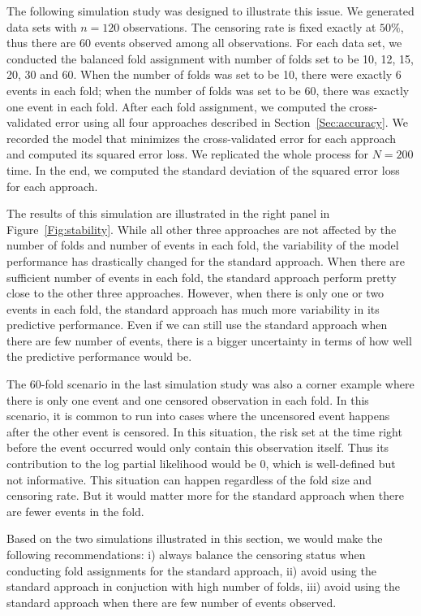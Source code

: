 The following simulation study was designed to illustrate this issue. We generated data sets with $n = 120$ observations. The censoring rate is fixed exactly at $50\%$, thus there are 60 events observed among all observations. For each data set, we conducted the balanced fold assignment with number of folds set to be 10, 12, 15, 20, 30 and 60. When the number of folds was set to be 10, there were exactly 6 events in each fold; when the number of folds was set to be 60, there was exactly one event in each fold. After each fold assignment, we computed the cross-validated error using all four approaches described in Section~\ref{Sec:accuracy}. We recorded the model that minimizes the cross-validated error for each approach and computed its squared error loss. We replicated the whole process for $N = 200$ time. In the end, we computed the standard deviation of the squared error loss for each approach. 

The results of this simulation are illustrated in the right panel in Figure~\ref{Fig:stability}. While all other three approaches are not affected by the number of folds and number of events in each fold, the variability of the model performance has drastically changed for the standard approach. When there are sufficient number of events in each fold, the standard approach perform pretty close to the other three approaches. However, when there is only one or two events in each fold, the standard approach has much more variability in its predictive performance. Even if we can still use the standard approach when there are few number of events, there is a bigger uncertainty in terms of how well the predictive performance would be. 

The 60-fold scenario in the last simulation study was also a corner example where there is only one event and one censored observation in each fold. In this scenario, it is common to run into cases where the uncensored event happens after the other event is censored. In this situation, the risk set at the time right before the event occurred would only contain this observation itself. Thus its contribution to the log partial likelihood would be 0, which is well-defined but not informative. This situation can happen regardless of the fold size and censoring rate. But it would matter more for the standard approach when there are fewer events in the fold.

Based on the two simulations illustrated in this section, we would make the following recommendations: i) always balance the censoring status when conducting fold assignments for the standard approach, ii) avoid using the standard approach in conjuction with high number of folds, iii) avoid using the standard approach when there are few number of events observed.

